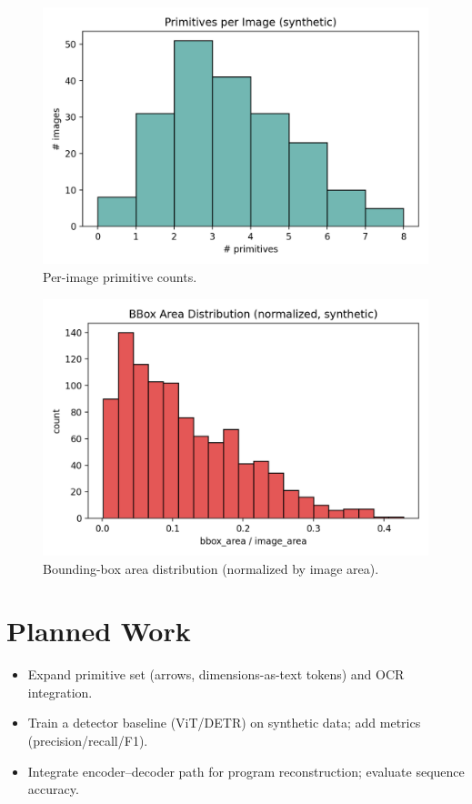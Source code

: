 \documentclass[11pt,a4paper]{article}
\begin{document}
\begin{figure}[!htbp]
  \centering
  \includegraphics[width=0.85\linewidth]{figs/primitives_per_image.png}
  \caption{Per-image primitive counts.}\label{fig:counts}
\end{figure}

\begin{figure}[!htbp]
  \centering
  \includegraphics[width=0.85\linewidth]{figs/bbox_area_hist.png}
  \caption{Bounding-box area distribution (normalized by image area).}\label{fig:areas}
\end{figure}

\section{Planned Work}
\begin{itemize}[leftmargin=*]
  \item Expand primitive set (arrows, dimensions-as-text tokens) and OCR integration.
  \item Train a detector baseline (ViT/DETR) on synthetic data; add metrics (precision/recall/F1).
  \item Integrate encoder--decoder path for program reconstruction; evaluate sequence accuracy.
\end{itemize}
\end{document}
